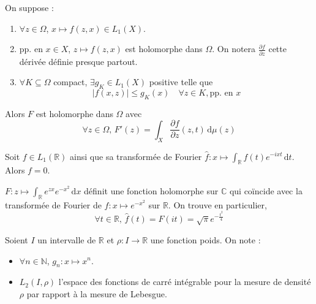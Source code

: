 
  \begin{theorem}
    On suppose :
    \begin{enumerate}[label=(\roman*)]
      \item $\forall z \in \Omega$, $x \mapsto f(z,x) \in L_1(X)$.
      \item pp. en $x \in X$, $z \mapsto f(z,x)$ est holomorphe dans $\Omega$. On notera $\frac{\partial f}{\partial z}$ cette dérivée définie presque partout.
      \item $\forall K \subseteq \Omega$ compact, $\exists g_K \in L_1(X)$ positive telle que
      \[ \left| f(x,z) \right| \leq g_K(x) \quad \forall z \in K, \text{pp. en } x \]
    \end{enumerate}
    Alors $F$ est holomorphe dans $\Omega$ avec
    \[ \forall z \in \Omega, \, F'(z) = \int_X \frac{\partial f}{\partial z}(z, t) \, \mathrm{d}\mu(z) \]
  \end{theorem}


  \begin{application}
    Soit $f \in L_1(\mathbb{R})$ ainsi que sa transformée de Fourier $\widehat{f} : x \mapsto \int_{\mathbb{R}} f(t) e^{-ixt} \, \mathrm{d}t$. Alors $f = 0$.
  \end{application}


  \begin{application}
    $F : z \mapsto \int_{\mathbb{R}} e^{zx} e^{-x^2} \, \mathrm{d}x$ définit une fonction holomorphe sur $\mathbb{C}$ qui coïncide avec la transformée de Fourier de $f : x \mapsto e^{-x^2}$ sur $\mathbb{R}$. On trouve en particulier,
    \[ \forall t \in \mathbb{R}, \, \widehat{f}(t) = F(it) = \sqrt{\pi} e^{-\frac{t^2}{4}} \]
  \end{application}


  \begin{notation}
    Soient $I$ un intervalle de $\mathbb{R}$ et $\rho : I \rightarrow \mathbb{R}$ une fonction poids. On note :
    \begin{itemize}
      \item $\forall n \in \mathbb{N}$, $g_n : x \mapsto x^n$.
      \item $L_2(I, \rho)$ l'espace des fonctions de carré intégrable pour la mesure de densité $\rho$ par rapport à la mesure de Lebesgue.
    \end{itemize}
  \end{notation}

